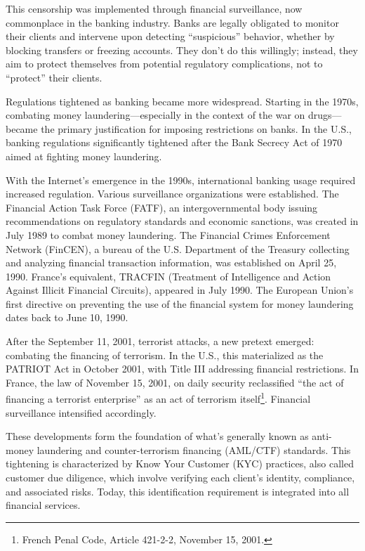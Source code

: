 \documentclass[
  a5paper,
  smalldemyvopaper,10pt,twoside,onecolumn,openright,extrafontsizes,hidelinks]{memoir}
\begin{document}
This censorship was implemented through financial surveillance, now
commonplace in the banking industry. Banks are legally obligated to
monitor their clients and intervene upon detecting ``suspicious''
behavior, whether by blocking transfers or freezing accounts. They don't
do this willingly; instead, they aim to protect themselves from
potential regulatory complications, not to ``protect'' their clients.

Regulations tightened as banking became more widespread. Starting in the
1970s, combating money laundering---especially in the context of the war
on drugs---became the primary justification for imposing restrictions on
banks. In the U.S., banking regulations significantly tightened after
the Bank Secrecy Act of 1970 aimed at fighting money laundering.

With the Internet's emergence in the 1990s, international banking usage
required increased regulation. Various surveillance organizations were
established. The Financial Action Task Force (FATF), an
intergovernmental body issuing recommendations on regulatory standards
and economic sanctions, was created in July 1989 to combat money
laundering. The Financial Crimes Enforcement Network (FinCEN), a bureau
of the U.S. Department of the Treasury collecting and analyzing
financial transaction information, was established on April 25, 1990.
France's equivalent, TRACFIN (Treatment of Intelligence and Action
Against Illicit Financial Circuits), appeared in July 1990. The European
Union's first directive on preventing the use of the financial system
for money laundering dates back to June 10, 1990.

After the September 11, 2001, terrorist attacks, a new pretext emerged:
combating the financing of terrorism. In the U.S., this materialized as
the PATRIOT Act in October 2001, with Title III addressing financial
restrictions. In France, the law of November 15, 2001, on daily security
reclassified ``the act of financing a terrorist enterprise'' as an act
of terrorism itself\footnote{French Penal Code, Article 421-2-2,
  November 15, 2001.}. Financial surveillance intensified accordingly.

These developments form the foundation of what's generally known as
anti-money laundering and counter-terrorism financing (AML/CTF)
standards. This tightening is characterized by Know Your Customer (KYC)
practices, also called customer due diligence, which involve verifying
each client's identity, compliance, and associated risks. Today, this
identification requirement is integrated into all financial services.
\end{document}
